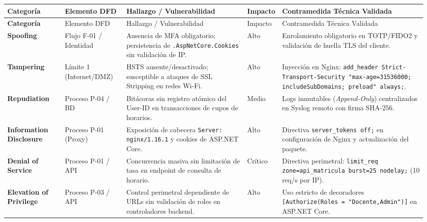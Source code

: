 \begin{center}
\scriptsize
\setlength{\tabcolsep}{3pt}
\renewcommand{\arraystretch}{1.2}
\begin{longtable}{>{\bfseries}p{1.9cm} p{1.9cm} p{4.0cm} >{\centering\arraybackslash}p{1.1cm} p{4.8cm}}
\toprule
\rowcolor{outermarginbgcolor}
Categoría & Elemento DFD & Hallazgo / Vulnerabilidad & Impacto & Contramedida Técnica Validada \\
\midrule
\endfirsthead
\toprule
\rowcolor{outermarginbgcolor}
Categoría & Elemento DFD & Hallazgo / Vulnerabilidad & Impacto & Contramedida Técnica Validada \\
\midrule
\endhead
\bottomrule
\endfoot
Spoofing & Flujo F-01 / Identidad & Ausencia de MFA obligatorio; persistencia de \texttt{.AspNetCore.Cookies} sin validación de IP. & Alto & Enrolamiento obligatorio en TOTP/FIDO2 y validación de huella TLS del cliente. \\
\midrule
Tampering & Límite 1 (Internet/DMZ) & HSTS ausente/desactivado; susceptible a ataques de SSL Stripping en redes Wi-Fi. & Alto & Inyección en Nginx: \texttt{add\_header Strict-Transport-Security "max-age=31536000; includeSubDomains; preload" always;}. \\
\midrule
Repudiation & Proceso P-04 / BD & Bitácoras sin registro atómico del User-ID en transacciones de cupos de horarios. & Medio & Logs inmutables (\textit{Append-Only}) centralizados en Syslog remoto con firma SHA-256. \\
\midrule
Information Disclosure & Proceso P-01 (Proxy) & Exposición de cabecera \texttt{Server: nginx/1.16.1} y cookies de ASP.NET Core. & Alto & Directiva \texttt{server\_tokens off;} en configuración de Nginx y actualización del paquete. \\
\midrule
Denial of Service & Proceso P-01 / API & Concurrencia masiva sin limitación de tasa en endpoint de consulta de horario. & Crítico & Directiva perimetral: \texttt{limit\_req zone=api\_matricula burst=25 nodelay;} (10 req/s por IP). \\
\midrule
Elevation of Privilege & Proceso P-03 / API & Control perimetral dependiente de URLs sin validación de roles en controladores backend. & Alto & Uso estricto de decoradores \texttt{[Authorize(Roles = "Docente,Admin")]} en ASP.NET Core. \\
\bottomrule
\end{longtable}
\end{center}

\newpage
